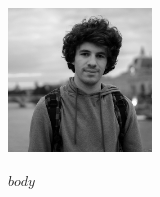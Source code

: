 \documentclass[a4paper, 11pt]{article}
\begin{document}
\begin{flushright}
\includegraphics[width=1.5in]{images/avatar.jpg}
\end{flushright}

\vspace{-1.2in}

$body$
\end{document}
